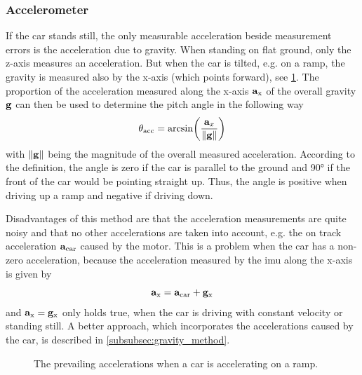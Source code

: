 \subsubsection{Accelerometer}
\label{ssec:linear_acceleration_only}
If the car stands still, the only measurable acceleration beside measurement errors is the acceleration due to gravity.
When standing on flat ground, only the z-axis measures an acceleration.
But when the car is tilted, e.g. on a ramp, the gravity is measured also by the x-axis (which points forward), see \cref{fig:tikz_car_gravity}.
The proportion of the acceleration measured along the x-axis $\vb{a}_\mathrm{x} $ of the overall gravity $\vb{g}$ can then be used to determine the pitch angle in the following way
\begin{equation}
	\label{eq:ang_from_acc}
	\theta_\mathrm{acc}  = \arcsin(\frac{\vb{a}_x}{\norm{\vb{g}}})
\end{equation}
with $\norm{\vb{g}}$ being the magnitude of the overall measured acceleration.
According to the definition, the angle is zero if the car is parallel to the ground and \ang{90} if the front of the car would be pointing straight up.
Thus, the angle is positive when driving up a ramp and negative if driving down.\par
Disadvantages of this method are that the acceleration measurements are quite noisy and that no other accelerations are taken into account, e.g. the on track acceleration $\vb{a}_\mathrm{car}$ caused by the motor.
This is a problem when the car has a non-zero acceleration, because the acceleration measured by the \gls{imu} along the x-axis is given by
\begin{equation}
	\vb{a}_\mathrm{x} = \vb{a}_\mathrm{car} + \vb{g}_\mathrm{x}
\end{equation}
and $\vb{a}_\mathrm{x} = \vb{g}_\mathrm{x} $ only holds true, when the car is driving with constant velocity or standing still.
A better approach, which incorporates the accelerations caused by the car, is described in \cref{subsubsec:gravity_method}.
\begin{figure}[htb]
	\centering
	
	\caption[Prevailing accelerations on a ramp]{The prevailing accelerations when a car is accelerating on a ramp.}
	\label{fig:tikz_car_gravity}
\end{figure}
